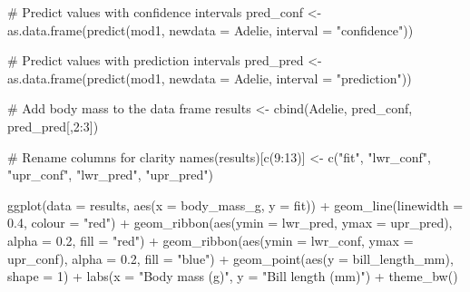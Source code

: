 \documentclass[
  letterpaper,
]{book}
\newenvironment{Shaded}{\begin{snugshade}}{\end{snugshade}}
\newcommand{\AttributeTok}[1]{\textcolor[rgb]{0.40,0.45,0.13}{#1}}
\newcommand{\CommentTok}[1]{\textcolor[rgb]{0.37,0.37,0.37}{#1}}
\newcommand{\DecValTok}[1]{\textcolor[rgb]{0.68,0.00,0.00}{#1}}
\newcommand{\FloatTok}[1]{\textcolor[rgb]{0.68,0.00,0.00}{#1}}
\newcommand{\FunctionTok}[1]{\textcolor[rgb]{0.28,0.35,0.67}{#1}}
\newcommand{\NormalTok}[1]{\textcolor[rgb]{0.00,0.23,0.31}{#1}}
\newcommand{\OtherTok}[1]{\textcolor[rgb]{0.00,0.23,0.31}{#1}}
\newcommand{\SpecialCharTok}[1]{\textcolor[rgb]{0.37,0.37,0.37}{#1}}
\newcommand{\StringTok}[1]{\textcolor[rgb]{0.13,0.47,0.30}{#1}}
\begin{document}
\begin{Shaded}
\begin{Highlighting}[]
\CommentTok{\# Predict values with confidence intervals}
\NormalTok{pred\_conf }\OtherTok{\textless{}{-}} \FunctionTok{as.data.frame}\NormalTok{(}\FunctionTok{predict}\NormalTok{(mod1,}
                                   \AttributeTok{newdata =}\NormalTok{ Adelie,}
                                   \AttributeTok{interval =} \StringTok{"confidence"}\NormalTok{))}

\CommentTok{\# Predict values with prediction intervals}
\NormalTok{pred\_pred }\OtherTok{\textless{}{-}} \FunctionTok{as.data.frame}\NormalTok{(}\FunctionTok{predict}\NormalTok{(mod1,}
                                   \AttributeTok{newdata =}\NormalTok{ Adelie,}
                                   \AttributeTok{interval =} \StringTok{"prediction"}\NormalTok{))}

\CommentTok{\# Add body mass to the data frame}
\NormalTok{results }\OtherTok{\textless{}{-}} \FunctionTok{cbind}\NormalTok{(Adelie, pred\_conf, pred\_pred[,}\DecValTok{2}\SpecialCharTok{:}\DecValTok{3}\NormalTok{])}

\CommentTok{\# Rename columns for clarity}
\FunctionTok{names}\NormalTok{(results)[}\FunctionTok{c}\NormalTok{(}\DecValTok{9}\SpecialCharTok{:}\DecValTok{13}\NormalTok{)] }\OtherTok{\textless{}{-}} \FunctionTok{c}\NormalTok{(}\StringTok{"fit"}\NormalTok{, }\StringTok{"lwr\_conf"}\NormalTok{, }\StringTok{"upr\_conf"}\NormalTok{,}
                             \StringTok{"lwr\_pred"}\NormalTok{, }\StringTok{"upr\_pred"}\NormalTok{)}

\FunctionTok{ggplot}\NormalTok{(}\AttributeTok{data =}\NormalTok{ results, }\FunctionTok{aes}\NormalTok{(}\AttributeTok{x =}\NormalTok{ body\_mass\_g, }\AttributeTok{y =}\NormalTok{ fit)) }\SpecialCharTok{+}
  \FunctionTok{geom\_line}\NormalTok{(}\AttributeTok{linewidth =} \FloatTok{0.4}\NormalTok{, }\AttributeTok{colour =} \StringTok{"red"}\NormalTok{) }\SpecialCharTok{+}
  \FunctionTok{geom\_ribbon}\NormalTok{(}\FunctionTok{aes}\NormalTok{(}\AttributeTok{ymin =}\NormalTok{ lwr\_pred, }\AttributeTok{ymax =}\NormalTok{ upr\_pred),}
              \AttributeTok{alpha =} \FloatTok{0.2}\NormalTok{, }\AttributeTok{fill =} \StringTok{"red"}\NormalTok{) }\SpecialCharTok{+}
  \FunctionTok{geom\_ribbon}\NormalTok{(}\FunctionTok{aes}\NormalTok{(}\AttributeTok{ymin =}\NormalTok{ lwr\_conf, }\AttributeTok{ymax =}\NormalTok{ upr\_conf),}
              \AttributeTok{alpha =} \FloatTok{0.2}\NormalTok{, }\AttributeTok{fill =} \StringTok{"blue"}\NormalTok{) }\SpecialCharTok{+}
  \FunctionTok{geom\_point}\NormalTok{(}\FunctionTok{aes}\NormalTok{(}\AttributeTok{y =}\NormalTok{ bill\_length\_mm), }\AttributeTok{shape =} \DecValTok{1}\NormalTok{) }\SpecialCharTok{+}
  \FunctionTok{labs}\NormalTok{(}\AttributeTok{x =} \StringTok{"Body mass (g)"}\NormalTok{, }\AttributeTok{y =} \StringTok{"Bill length (mm)"}\NormalTok{) }\SpecialCharTok{+}
  \FunctionTok{theme\_bw}\NormalTok{()}
\end{Highlighting}
\end{Shaded}
\end{document}
